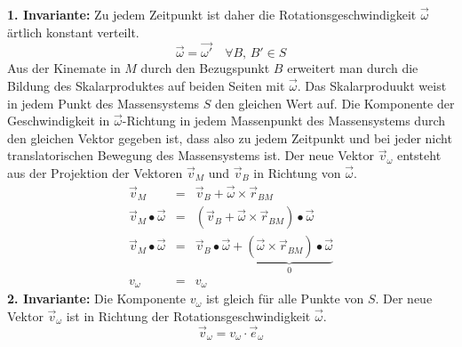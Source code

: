 \textbf{1. Invariante:} Zu jedem Zeitpunkt ist daher die Rotationsgeschwindigkeit $\overrightarrow{\omega}$ ärtlich konstant verteilt.
\begin{equation}
\boxed{\overrightarrow{\omega}=\overrightarrow{\omega'}\quad \forall B,\,B'\in S}
\end{equation}
Aus der Kinemate in $M$ durch den Bezugspunkt $B$ erweitert man durch die Bildung des Skalarproduktes auf beiden Seiten mit $\overrightarrow{\omega}$. Das Skalarproduukt weist in jedem Punkt des Massensystems $S$ den gleichen Wert auf. Die Komponente der Geschwindigkeit in $\overrightarrow{\omega}$-Richtung in jedem Massenpunkt des Massensystems durch den gleichen Vektor gegeben ist, dass also zu jedem Zeitpunkt und bei jeder nicht translatorischen Bewegung des Massensystems ist. Der neue Vektor $\overrightarrow{v}_{\omega}$ entsteht aus der Projektion der Vektoren $\overrightarrow{v}_M$ und $\overrightarrow{v}_B$ in Richtung von $\overrightarrow{\omega}$.
\begin{equation}
\boxed{\begin{array}{lll}
\overrightarrow{v}_M&=&\overrightarrow{v}_B+\overrightarrow{\omega}\times \overrightarrow{r}_{BM}\\
\overrightarrow{v}_M\bullet \overrightarrow{\omega}&=&\left(\overrightarrow{v}_B+\overrightarrow{\omega}\times \overrightarrow{r}_{BM}\right)\bullet \overrightarrow{\omega}\\
\overrightarrow{v}_M\bullet \overrightarrow{\omega}&=&\overrightarrow{v}_B\bullet \overrightarrow{\omega}+\underbrace{\left(\overrightarrow{\omega}\times \overrightarrow{r}_{BM}\right)\bullet \overrightarrow{\omega}}_{0}\\
v_{\omega}&=&v_{\omega}
\end{array}}
\end{equation}
\textbf{2. Invariante:} Die Komponente $v_{\omega}$ ist gleich für alle Punkte von $S$. Der neue Vektor $\overrightarrow{v}_{\omega}$ ist in Richtung der Rotationsgeschwindigkeit $\overrightarrow{\omega}$.
\begin{equation}
\boxed{\overrightarrow{v}_{\omega}=v_{\omega}\cdot \overrightarrow{e}_{\omega}}
\end{equation}
